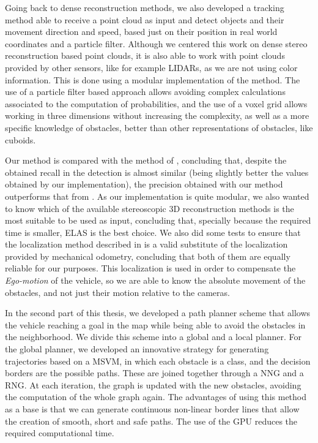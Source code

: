 Going back to dense reconstruction methods, we also developed a tracking method able to receive a point cloud as input and detect objects and their movement direction and speed, based just on their position in real world coordinates and a particle filter. Although we centered this work on dense stereo reconstruction based point clouds, it is also able to work with point clouds provided by other sensors, like for example \acp{LIDAR}, as we are not using color information. This is done using a modular implementation of the method. The use of a particle filter based approach allows avoiding complex calculations associated to the computation of probabilities, and the use of a voxel grid allows working in three dimensions without increasing the complexity, as well as a more specific knowledge of obstacles, better than other representations of obstacles, like cuboids.

Our method is compared with the method of \cite{danescu2012particle}, concluding that, despite the obtained recall in the detection is almost similar (being slightly better the values obtained by our implementation), the precision obtained with our method outperforms that from \cite{danescu2012particle}. As our implementation is quite modular, we also wanted to know which of the available stereoscopic 3D reconstruction methods is the most suitable to be used as input, concluding that, specially because the required time is smaller, \ac{ELAS} is the best choice. We also did some tests to ensure that the localization method described in \cite{geiger2011stereoscan} is a valid substitute of the localization provided by mechanical odometry, concluding that both of them are equally reliable for our purposes. This localization is used in order to compensate the \emph{Ego-motion} of the vehicle, so we are able to know the absolute movement of the obstacles, and not just their motion relative to the cameras.

In the second part of this thesis, we developed a path planner scheme that allows the vehicle reaching a goal in the map while being able to avoid the obstacles in the neighborhood. We divide this scheme into a global and a local planner. For the global planner, we developed an innovative strategy for generating trajectories based on a \ac{MSVM}, in which each obstacle is a class, and the decision borders are the possible paths. These are joined together through a \acl{NNG} and a \acl{RNG}. At each iteration, the graph is updated with the new obstacles, avoiding the computation of the whole graph again. The advantages of using this method as a base is that we can generate continuous non-linear border lines that allow the creation of smooth, short and safe paths. The use of the \acs{GPU} reduces the required computational time.

